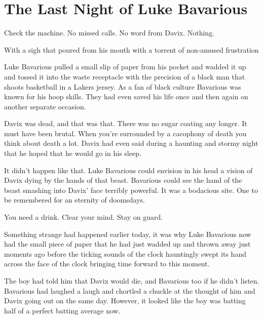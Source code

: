 \chapter{The Last Night of Luke Bavarious}







Check the machine. No missed calls. No word from Davix.
Nothing.



With a sigh that poured from his mouth with a torrent of non-amused
frustration

Luke Bavarious pulled a small slip of paper from his pocket and
wadded it up and tossed it into the waste receptacle with the
precision of a black man that shoots basketball in a Lakers jersey.
As a fan of black culture Bavarious was known for his hoop skills.
They had even saved his life once and then again on another
separate occasion.



Davix was dead, and that was that. There was no sugar coating any
longer. It must have been brutal. When you're surrounded by a
cacophony of death you think about death a lot. Davix had even said
during a haunting and stormy night that he hoped that he would go
in his sleep.



It didn't happen like that. Luke Bavarious could envision in
his head a vision of Davix dying by the hands of that beast.
Bavarious could see the hand of the beast smashing into
Davix' face terribly powerful. It was a bodacious site. One
to be remembered for an eternity of doomsdays.



You need a drink. Clear your mind. Stay on guard.



Something strange had happened earlier today, it was why Luke
Bavarious now had the small piece of paper that he had just wadded
up and thrown away just moments ago before the ticking sounds of
the clock hauntingly swept its hand across the face of the clock
bringing time forward to this moment.



The boy had told him that Davix would die, and Bavarious too if he
didn't listen. Bavarious had laughed a laugh and chortled a
chuckle at the thought of him and Davix going out on the same day.
However, it looked like the boy was batting half of a perfect
batting average now.



